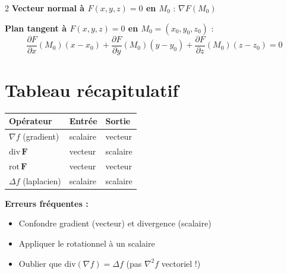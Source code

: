 \documentclass[10pt,a4paper]{article}
\begin{document}
\begin{multicols}{2}
\textbf{Vecteur normal à $F(x,y,z)=0$ en $M_0$} : $\nabla F(M_0)$

\textbf{Plan tangent à $F(x,y,z)=0$ en $M_0=(x_0,y_0,z_0)$} :
$$\frac{\partial F}{\partial x}(M_0)(x-x_0) + \frac{\partial F}{\partial y}(M_0)(y-y_0) + \frac{\partial F}{\partial z}(M_0)(z-z_0) = 0$$

\section{Tableau récapitulatif}

\begin{grisbox}
\renewcommand{\arraystretch}{1.3}
\begin{tabular}{@{}lll@{}}
\textbf{Opérateur} & \textbf{Entrée} & \textbf{Sortie}\\
\hline
$\nabla f$ (gradient) & scalaire & vecteur \\
$\mathrm{div}\,\mathbf{F}$ & vecteur & scalaire \\
$\mathrm{rot}\,\mathbf{F}$ & vecteur & vecteur \\
$\Delta f$ (laplacien) & scalaire & scalaire \\
\end{tabular}
\end{grisbox}

\begin{alertbox}
\textbf{Erreurs fréquentes :}
\begin{itemize}[leftmargin=1em,itemsep=0pt]
  \item Confondre gradient (vecteur) et divergence (scalaire)
  \item Appliquer le rotationnel à un scalaire
  \item Oublier que $\mathrm{div}(\nabla f) = \Delta f$ (pas $\nabla^2 f$ vectoriel !)
\end{itemize}
\end{alertbox}

\end{multicols}
\end{document}

